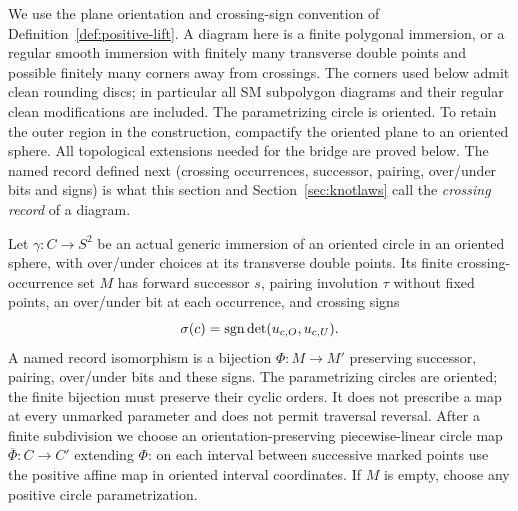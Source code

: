 We use the plane orientation and crossing-sign convention of
Definition~\ref{def:positive-lift}. A diagram here is a finite polygonal
immersion, or a regular smooth immersion with finitely many transverse
double points and possible finitely many corners away from crossings.
The corners used below admit clean rounding discs; in particular all SM
subpolygon diagrams and their regular clean modifications are included.
The parametrizing circle is oriented. To retain the outer region in the
construction, compactify the oriented plane to an oriented sphere.
All topological extensions needed for the bridge are proved below.
The named record defined next (crossing occurrences, successor, pairing,
over/under bits and signs) is what this section and
Section~\ref{sec:knotlaws} call the \emph{crossing record} of a diagram.

\begin{definition}\label{def:gauss-record}
Let $\gamma:C\to S^2$ be an actual generic immersion of an oriented
circle in an oriented sphere, with over/under choices at its transverse
double points. Its finite crossing-occurrence set $M$ has forward successor
$s$, pairing involution $\tau$ without fixed points, an over/under bit at
each occurrence, and crossing signs
\begin{equation}\label{eq:gauss-cross-sign}
 \sigma(c)=\operatorname{sgn}\det(u_{c,O},u_{c,U}).
\end{equation}
A named record isomorphism is a bijection $\Phi:M\to M'$ preserving
successor, pairing, over/under bits and these signs. The parametrizing
circles are oriented; the finite bijection must preserve their cyclic
orders. It does not prescribe a map at every unmarked parameter and
does not permit traversal reversal. After a finite subdivision we choose
an orientation-preserving piecewise-linear circle map
$\overline\Phi:C\to C'$ extending $\Phi$: on each interval between
successive marked points use the positive affine map in oriented interval
coordinates. If $M$ is empty, choose any positive circle parametrization.
\end{definition}

